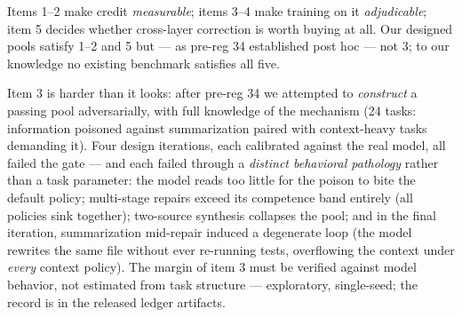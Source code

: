 \documentclass{article}
\theoremstyle{remark}
\begin{document}
Items 1--2 make credit \emph{measurable}; items 3--4 make training on it
\emph{adjudicable}; item 5 decides whether cross-layer correction is worth
buying at all. Our designed pools satisfy 1--2 and 5 but --- as pre-reg 34
established post hoc --- not 3; to our knowledge no existing benchmark
satisfies all five.

Item 3 is harder than it looks: after pre-reg 34 we attempted to
\emph{construct} a passing pool adversarially, with full knowledge of the
mechanism (24 tasks: information poisoned against summarization paired
with context-heavy tasks demanding it). Four design iterations, each
calibrated against the real model, all failed the gate --- and each failed
through a \emph{distinct behavioral pathology} rather than a task
parameter: the model reads too little for the poison to bite the default
policy; multi-stage repairs exceed its competence band entirely (all
policies sink together); two-source synthesis collapses the pool; and in
the final iteration, summarization mid-repair induced a
degenerate loop (the model rewrites the same file without ever re-running
tests, overflowing the context under \emph{every} context policy). The
margin of item 3 must be verified against model behavior, not estimated
from task structure --- exploratory, single-seed; the record is in the
released ledger artifacts.
\end{document}

